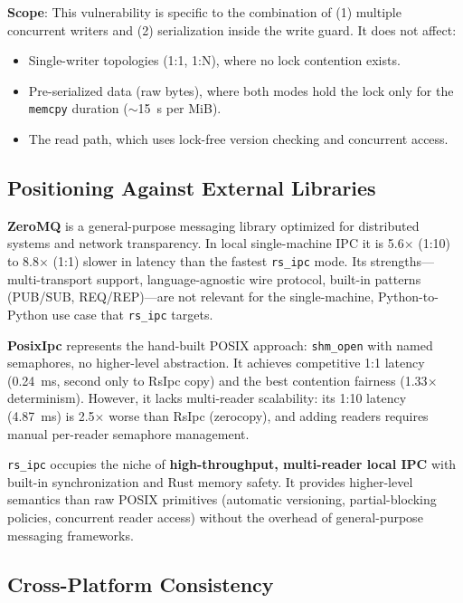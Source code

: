 \textbf{Scope}: This vulnerability is specific to the combination of (1) multiple concurrent writers and (2) serialization inside the write guard. It does not affect:
\begin{itemize}
    \item Single-writer topologies (1:1, 1:N), where no lock contention exists.
    \item Pre-serialized data (raw bytes), where both modes hold the lock only for the \texttt{memcpy} duration ($\sim$15~\textmu s per MiB).
    \item The read path, which uses lock-free version checking and concurrent access.
\end{itemize}

\subsection{Positioning Against External Libraries}

\textbf{ZeroMQ} is a general-purpose messaging library optimized for distributed systems and network transparency. In local single-machine IPC it is 5.6$\times$ (1:10) to 8.8$\times$ (1:1) slower in latency than the fastest \texttt{rs\_ipc} mode. Its strengths---multi-transport support, language-agnostic wire protocol, built-in patterns (PUB/SUB, REQ/REP)---are not relevant for the single-machine, Python-to-Python use case that \texttt{rs\_ipc} targets.

\textbf{PosixIpc} represents the hand-built POSIX approach: \texttt{shm\_open} with named semaphores, no higher-level abstraction. It achieves competitive 1:1 latency (0.24~ms, second only to RsIpc copy) and the best contention fairness (1.33$\times$ determinism). However, it lacks multi-reader scalability: its 1:10 latency (4.87~ms) is 2.5$\times$ worse than RsIpc (zerocopy), and adding readers requires manual per-reader semaphore management.

\texttt{rs\_ipc} occupies the niche of \textbf{high-throughput, multi-reader local IPC} with built-in synchronization and Rust memory safety. It provides higher-level semantics than raw POSIX primitives (automatic versioning, partial-blocking policies, concurrent reader access) without the overhead of general-purpose messaging frameworks.

\subsection{Cross-Platform Consistency}
\label{subsec:cross_platform}

